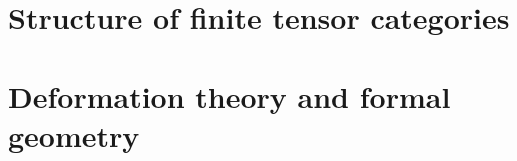     \begin{appendices}
        \chapter{Structure of finite tensor categories}
            \begin{abstract}
            
            \end{abstract}
            
            \minitoc
        
            
            
            
            
        \chapter{Deformation theory and formal geometry}
            \begin{abstract}
            
            \end{abstract}
            
            \minitoc
            
            
        
    \end{appendices}
	
	\printbibliography

